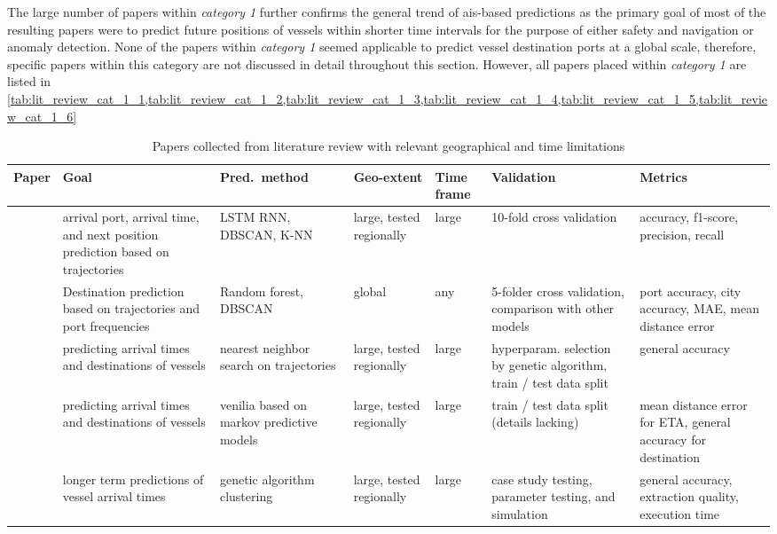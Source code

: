 The large number of papers within \textit{category 1} further confirms the general trend of \acrshort{ais}-based predictions as the primary goal of most of the resulting papers were to predict future positions of vessels within shorter time intervals for the purpose of either safety and navigation or anomaly detection. None of the papers within \textit{category 1} seemed applicable to predict vessel destination ports at a global scale, therefore, specific papers within this category are not discussed in detail throughout this section. However, all papers placed within \textit{category 1} are listed in  \cref{tab:lit_review_cat_1_1,tab:lit_review_cat_1_2,tab:lit_review_cat_1_3,tab:lit_review_cat_1_4,tab:lit_review_cat_1_5,tab:lit_review_cat_1_6}

\begin{table}[htbp]
    \centering
    {\small\begin{tabular}{p{0.6in} p{0.8in} p{0.75in} p{0.6in} p{0.4in} p{0.8in} p{0.7in}}
    \toprule
    \bfseries{Paper} & \bfseries{Goal} & \bfseries{Pred.\ method} & \bfseries{Geo-extent} & \bfseries{Time frame} & \bfseries{Validation} & \bfseries{Metrics} \\ \midrule
        \cite{Karatas2020TrajectoryData} & arrival port, arrival time, and next position prediction based on trajectories & LSTM RNN, DBSCAN, K-NN & large, tested regionally & large & 10-fold cross validation & accuracy, f1-score, precision, recall \\ \midrule
        \cite{Zhang2020AISApproach} & Destination prediction based on trajectories and port frequencies & Random forest, DBSCAN & global & any & 5-folder cross validation, comparison with other models & port accuracy, city accuracy, MAE, mean distance error \\ \midrule
        \cite{Rosca2018GrandRoutes} & predicting arrival times and destinations of vessels & nearest neighbor search on trajectories & large, tested regionally & large & hyperparam. selection by genetic algorithm, train / test data split & general accuracy \\ \midrule
        \cite{Bachar2018GrandDestination} & predicting arrival times and destinations of vessels & venilia based on markov predictive models & large, tested regionally & large & train / test data split (details lacking) & mean distance error for ETA, general accuracy for destination \\ \midrule
        \cite{Dobrkovic2018MaritimeData} & longer term predictions of vessel arrival times & genetic algorithm clustering & large, tested regionally & large & case study testing, parameter testing, and simulation & general accuracy, extraction quality, execution time \\ \bottomrule
    \end{tabular}}
\caption{Papers collected from literature review with relevant geographical and time limitations}\label{tab:most_relevant_papers}
\end{table}

